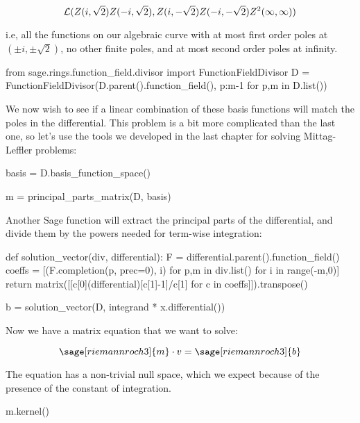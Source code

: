 $${\cal L}(Z(i, \sqrt{2}) Z(-i, \sqrt{2}), Z(i, -\sqrt{2}) Z(-i, -\sqrt{2}) Z^2(\infty,\infty))$$

i.e, all the functions on our algebraic curve with at most first order
poles at $(\pm i,\pm\sqrt{2})$, no other finite poles, and at most
second order poles at infinity.

\begin{sageblock}[riemannroch3]
from sage.rings.function_field.divisor import FunctionFieldDivisor
D = FunctionFieldDivisor(D.parent().function_field(), {p:m-1 for p,m in D.list()})
\end{sageblock}

We now wish to see if a linear combination of these basis functions will
match the poles in the differential.  This problem is a bit more complicated
than the last one, so let's use the tools we developed in the
last chapter for solving Mittag-Leffler problems:

\begin{sageblock}[riemannroch3]
basis = D.basis_function_space()
\end{sageblock}

\begin{sageblock}[riemannroch3]
m = principal_parts_matrix(D, basis)
\end{sageblock}

Another Sage function will extract the principal parts of the
differential, and divide them by the powers needed for term-wise
integration:

\begin{sageblock}[riemannroch3]
def solution_vector(div, differential):
    F = differential.parent().function_field()
    coeffs = [(F.completion(p, prec=0), i) for p,m in div.list() for i in range(-m,0)]
    return matrix([[c[0](differential)[c[1]-1]/c[1] for c in coeffs]]).transpose()
\end{sageblock}

\begin{sageblock}[riemannroch3]
b = solution_vector(D, integrand * x.differential())
\end{sageblock}

Now we have a matrix equation that we want to solve:

$$\sage[riemannroch3]{m} \cdot v = \sage[riemannroch3]{b}$$

The equation has a non-trivial null space, which we expect because
of the presence of the constant of integration.

\begin{sageblock}[riemannroch3]
m.kernel()
\end{sageblock}

